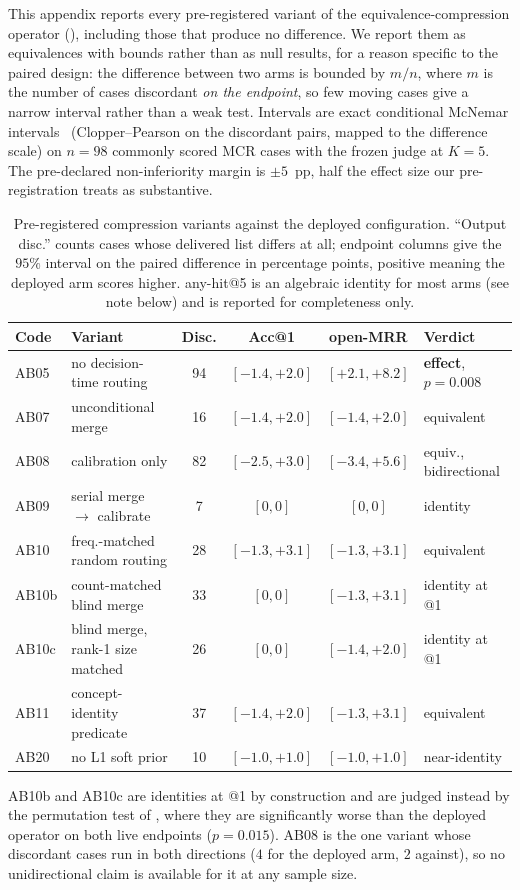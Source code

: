 This appendix reports every pre-registered variant of the equivalence-compression operator (), including those that produce no difference.
We report them as equivalences with bounds rather than as null results, for a reason specific to the paired design: the difference between two arms is bounded by $m/n$, where $m$ is the number of cases discordant \emph{on the endpoint}, so few moving cases give a narrow interval rather than a weak test.
Intervals are exact conditional McNemar intervals~\cite{mcnemar1947} (Clopper--Pearson on the discordant pairs, mapped to the difference scale) on $n=98$ commonly scored MCR cases with the frozen judge at $K{=}5$.
The pre-declared non-inferiority margin is $\pm 5$~pp, half the effect size our pre-registration treats as substantive.

\begin{table}[t]
\centering
\scriptsize
\caption{Pre-registered compression variants against the deployed configuration. ``Output disc.'' counts cases whose delivered list differs at all; endpoint columns give the $95\%$ interval on the paired difference in percentage points, positive meaning the deployed arm scores higher. any-hit@5 is an algebraic identity for most arms (see note below) and is reported for completeness only.}
\label{tab:eq-equiv}
\begin{tabular}{llcccl}
\toprule
Code & Variant & Disc. & Acc@1 & open-MRR & Verdict \\
\midrule
AB05 & no decision-time routing & 94 & $[-1.4,+2.0]$ & $\mathbf{[+2.1,+8.2]}$ & \textbf{effect}, $p=0.008$ \\
AB07 & unconditional merge & 16 & $[-1.4,+2.0]$ & $[-1.4,+2.0]$ & equivalent \\
AB08 & calibration only & 82 & $[-2.5,+3.0]$ & $[-3.4,+5.6]$ & equiv., bidirectional \\
AB09 & serial merge $\rightarrow$ calibrate & 7 & $[0,0]$ & $[0,0]$ & identity \\
AB10 & freq.-matched random routing & 28 & $[-1.3,+3.1]$ & $[-1.3,+3.1]$ & equivalent \\
AB10b & count-matched blind merge & 33 & $[0,0]$ & $[-1.3,+3.1]$ & identity at @1 \\
AB10c & blind merge, rank-1 size matched & 26 & $[0,0]$ & $[-1.4,+2.0]$ & identity at @1 \\
AB11 & concept-identity predicate & 37 & $[-1.4,+2.0]$ & $[-1.3,+3.1]$ & equivalent \\
AB20 & no L1 soft prior & 10 & $[-1.0,+1.0]$ & $[-1.0,+1.0]$ & near-identity \\
\bottomrule
\end{tabular}

\noindent
AB10b and AB10c are identities at @1 by construction and are judged instead by the permutation test of , where they are significantly worse than the deployed operator on both live endpoints ($p=0.015$).
AB08 is the one variant whose discordant cases run in both directions ($4$ for the deployed arm, $2$ against), so no unidirectional claim is available for it at any sample size.
\end{table}

